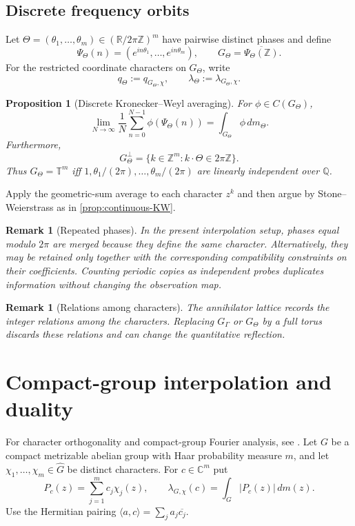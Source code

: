 \documentclass[12pt,a4paper,twoside]{extarticle}
\makeatletter
\theoremstyle{compactplain}
\newtheorem{proposition}[theorem]{Proposition}
\theoremstyle{compactdef}
\newtheorem{remark}[theorem]{Remark}
\renewenvironment{proof}[1][\proofname]{\par\pushQED{\qed}\normalfont
  \topsep2pt\trivlist\item[\hskip\labelsep\bfseries #1\@addpunct{.}]\ignorespaces}
 {\popQED\endtrivlist\@endpefalse}
\makeatother
\begin{document}
\subsection{Discrete frequency orbits}
Let $\Theta=(\theta_1,\dots,\theta_m)\in(\mathbb R/2\pi\mathbb Z)^m$ have pairwise distinct phases and define
\[
 \Psi_\Theta(n)=(e^{in\theta_1},\dots,e^{in\theta_m}),\qquad
 G_\Theta=\overline{\Psi_\Theta(\mathbb Z)}.
\]
For the restricted coordinate characters on $G_\Theta$, write
\[
 q_\Theta:=q_{G_\Theta,\chi},\qquad \lambda_\Theta:=\lambda_{G_\Theta,\chi}.
\]
\begin{proposition}[Discrete Kronecker--Weyl averaging]\label{prop:discrete-KW}
For $\phi\in C(G_\Theta)$,
\[
 \lim_{N\to\infty}\frac1N\sum_{n=0}^{N-1}\phi(\Psi_\Theta(n))
 =\int_{G_\Theta}\phi\,dm_\Theta.
\]
Furthermore,
\[
 G_\Theta^\perp=\{k\in\mathbb Z^m:k\cdot\Theta\in2\pi\mathbb Z\}.
\]
Thus $G_\Theta=\mathbb T^m$ iff $1,\theta_1/(2\pi),\dots,\theta_m/(2\pi)$ are linearly independent over $\mathbb Q$.
\end{proposition}
\begin{proof}
Apply the geometric-sum average to each character $z^k$ and then argue by Stone--Weierstrass as in \cref{prop:continuous-KW}.
\end{proof}

\begin{remark}[Repeated phases]
In the present interpolation setup, phases equal modulo $2\pi$ are merged because they define the same character.  Alternatively, they may be retained only together with the corresponding compatibility constraints on their coefficients.  Counting periodic copies as independent probes duplicates information without changing the observation map.
\end{remark}

\begin{remark}[Relations among characters]
The annihilator lattice records the integer relations among the characters. Replacing $G_\Gamma$ or $G_\Theta$ by a full torus discards these relations and can change the quantitative reflection.
\end{remark}

\section{Compact-group interpolation and duality}\label{sec:compact-interpolation}
For character orthogonality and compact-group Fourier analysis, see \cite{rudin,katznelson}.
Let $G$ be a compact metrizable abelian group with Haar probability measure $m$, and let $\chi_1,\dots,\chi_m\in\widehat G$ be distinct characters.  For $c\in\mathbb C^m$ put
\[
 P_c(z)=\sum_{j=1}^m c_j\chi_j(z),
 \qquad
 \lambda_{G,\chi}(c)=\int_G|P_c(z)|\,dm(z).
\]
Use the Hermitian pairing $\langle a,c\rangle=\sum_ja_j\overline{c_j}$.
\end{document}
